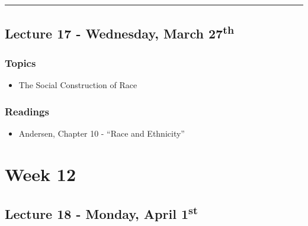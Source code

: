\documentclass[]{book}
\providecommand{\tightlist}{%
  \setlength{\itemsep}{0pt}\setlength{\parskip}{0pt}}
\begin{document}
\begin{center}\rule{0.5\linewidth}{\linethickness}\end{center}

\hypertarget{lecture-17---wednesday-march-27th}{%
\subsection*{\texorpdfstring{Lecture 17 - Wednesday, March 27\textsuperscript{th}}{Lecture 17 - Wednesday, March 27th}}\label{lecture-17---wednesday-march-27th}}

\hypertarget{topics-20}{%
\subsubsection*{Topics}\label{topics-20}}

\begin{itemize}
\tightlist
\item
  The Social Construction of Race
\end{itemize}

\hypertarget{readings-18}{%
\subsubsection*{Readings}\label{readings-18}}

\begin{itemize}
\tightlist
\item
  Andersen, Chapter 10 - ``Race and Ethnicity''
\end{itemize}

\hypertarget{week-12}{%
\section*{Week 12}\label{week-12}}

\hypertarget{lecture-18---monday-april-1st}{%
\subsection*{\texorpdfstring{Lecture 18 - Monday, April 1\textsuperscript{st}}{Lecture 18 - Monday, April 1st}}\label{lecture-18---monday-april-1st}}
\end{document}
